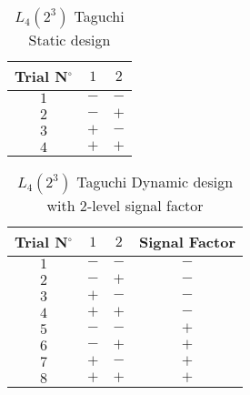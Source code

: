 	\begin{table}[H]\centering
	\begin{center}
		\begin{tabular}{|c|c|c|}
		\hline
		\multicolumn{1}{c}{\cellcolor{black!30}\textbf{Trial N${}^\circ$}} & 
  \multicolumn{1}{c}{\cellcolor{black!30}$1$} & 
  \multicolumn{1}{c}{\cellcolor{black!30}$2$} \\ \hline
		$1$ & $-$ & $-$ \\ \hline
		$2$ & $-$ & $+$ \\ \hline
		$3$ & $+$ & $-$ \\ \hline
		$4$ & $+$ & $+$ \\ \hline
 		\end{tabular}
	\end{center}
	\caption{$L_4(2^3)$ Taguchi Static design}
	\end{table}
	
	\begin{table}[H]\centering
	\begin{center}
		\begin{tabular}{|c|c|c|c|}
		\hline
		\multicolumn{1}{c}{\cellcolor{black!30}\textbf{Trial N${}^\circ$}} & 
  \multicolumn{1}{c}{\cellcolor{black!30}$1$} & 
  \multicolumn{1}{c}{\cellcolor{black!30}$2$}  & 
  \multicolumn{1}{c}{\cellcolor{black!30}Signal Factor}  \\ \hline
		$1$ & $-$ & $-$ & $-$ \\ \hline
		$2$ & $-$ & $+$ & $-$ \\ \hline
		$3$ & $+$ & $-$ & $-$ \\ \hline
		$4$ & $+$ & $+$ & $-$ \\ \hline
		$5$ & $-$ & $-$ & $+$ \\ \hline
		$6$ & $-$ & $+$ & $+$ \\ \hline
		$7$ & $+$ & $-$ & $+$ \\ \hline
		$8$ & $+$ & $+$ & $+$ \\ \hline
 		\end{tabular}
	\end{center}
	\caption{$L_4(2^3)$ Taguchi Dynamic design with $2$-level signal factor}
	\end{table}
	
